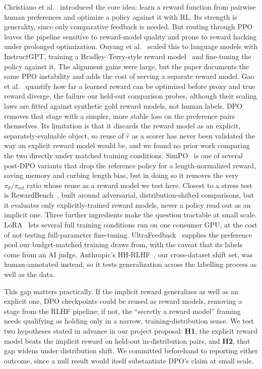 \documentclass[11pt]{article}
\begin{document}
Christiano et al.~\cite{christiano2017deep} introduced the core idea: learn a reward function
from pairwise human preferences and optimize a policy against it with RL. Its strength is
generality, since only comparative feedback is needed. But routing through PPO leaves the
pipeline sensitive to reward-model quality and prone to reward hacking under prolonged
optimization. Ouyang et al.~\cite{ouyang2022instructgpt} scaled this to language models with
InstructGPT, training a Bradley--Terry-style reward model~\cite{bradley1952rank} and fine-tuning
the policy against it. The alignment gains were large, but the paper documents the same PPO
instability and adds the cost of serving a separate reward model. Gao et
al.~\cite{gao2023overoptimization} quantify how far a learned reward can be optimized before
proxy and true reward diverge, the failure our held-out comparison probes, although their
scaling laws are fitted against synthetic gold reward models, not human labels.
DPO~\cite{rafailov2023dpo} removes that stage with a simpler, more stable loss on the preference
pairs themselves. Its limitation is that it discards the reward model as an explicit,
separately-evaluable object, so reuse of $\hat r$ as a scorer has never been validated the way
an explicit reward model would be, and we found no prior work comparing the two directly under
matched training conditions. SimPO~\cite{meng2024simpo} is one of several post-DPO
variants that drop the reference policy for a length-normalized reward, saving memory and
curbing length bias, but in doing so it removes the very $\pi_\theta/\pi_{\mathrm{ref}}$ ratio
whose reuse as a reward model we test here. Closest to a stress test is
RewardBench~\cite{lambert2024rewardbench}, built around adversarial, distribution-shifted
comparisons, but it evaluates only explicitly-trained reward models, never a policy read out as
an implicit one. Three further ingredients make the question tractable at small scale.
LoRA~\cite{hu2022lora} lets several full training conditions run on one consumer GPU, at the
cost of not testing full-parameter fine-tuning. UltraFeedback~\cite{cui2023ultrafeedback}
supplies the preference pool our budget-matched training draws from, with the caveat that its
labels come from an AI judge. Anthropic's HH-RLHF~\cite{bai2022hh}, our cross-dataset shift set,
was human-annotated instead, so it tests generalization across the labelling process as well as
the data.

This gap matters practically. If the implicit reward generalizes as well as an explicit one,
DPO checkpoints could be reused as reward models, removing a stage from the RLHF pipeline; if
not, the ``secretly a reward model'' framing needs qualifying as holding only in a narrow,
training-distribution sense. We test two hypotheses stated in advance in our project proposal:
\textbf{H1}, the explicit reward model beats the implicit reward on held-out in-distribution
pairs, and \textbf{H2}, that gap widens under distribution shift. We committed beforehand to
reporting either outcome, since a null result would itself substantiate DPO's claim at small
scale.
\end{document}
